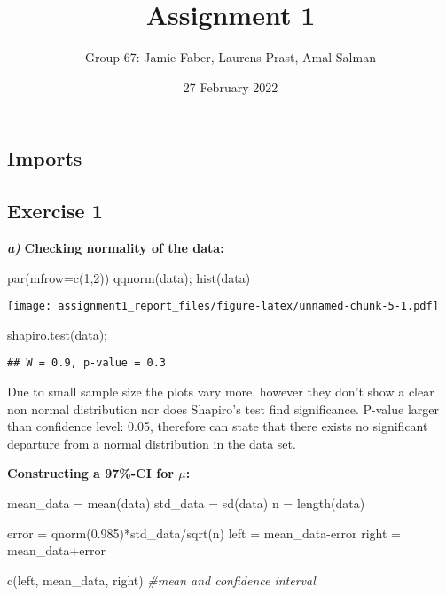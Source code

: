 \documentclass[
]{article}
\title{Assignment 1}
\author{Group 67: Jamie Faber, Laurens Prast, Amal Salman}
\date{27 February 2022}
\newenvironment{Shaded}{\begin{snugshade}}{\end{snugshade}}
\newcommand{\AttributeTok}[1]{\textcolor[rgb]{0.77,0.63,0.00}{#1}}
\newcommand{\CommentTok}[1]{\textcolor[rgb]{0.56,0.35,0.01}{\textit{#1}}}
\newcommand{\DecValTok}[1]{\textcolor[rgb]{0.00,0.00,0.81}{#1}}
\newcommand{\FloatTok}[1]{\textcolor[rgb]{0.00,0.00,0.81}{#1}}
\newcommand{\FunctionTok}[1]{\textcolor[rgb]{0.00,0.00,0.00}{#1}}
\newcommand{\NormalTok}[1]{#1}
\newcommand{\OtherTok}[1]{\textcolor[rgb]{0.56,0.35,0.01}{#1}}
\newcommand{\SpecialCharTok}[1]{\textcolor[rgb]{0.00,0.00,0.00}{#1}}
\begin{document}
\maketitle

\hypertarget{imports}{%
\subsection{Imports}\label{imports}}

\hypertarget{exercise-1}{%
\subsection{Exercise 1}\label{exercise-1}}

\textbf{\emph{a)}} \textbf{Checking normality of the data:}

\begin{Shaded}
\begin{Highlighting}[]
\FunctionTok{par}\NormalTok{(}\AttributeTok{mfrow=}\FunctionTok{c}\NormalTok{(}\DecValTok{1}\NormalTok{,}\DecValTok{2}\NormalTok{))}
\FunctionTok{qqnorm}\NormalTok{(data); }\FunctionTok{hist}\NormalTok{(data)}
\end{Highlighting}
\end{Shaded}

\texttt{[image: assignment1\_report\_files/figure-latex/unnamed-chunk-5-1.pdf]}

\begin{Shaded}
\begin{Highlighting}[]
\FunctionTok{shapiro.test}\NormalTok{(data);}
\end{Highlighting}
\end{Shaded}

\begin{verbatim}
## W = 0.9, p-value = 0.3
\end{verbatim}

Due to small sample size the plots vary more, however they don't show a
clear non normal distribution nor does Shapiro's test find significance.
P-value larger than confidence level: 0.05, therefore can state that
there exists no significant departure from a normal distribution in the
data set.

\textbf{Constructing a 97\%-CI for \(\mu\):}

\begin{Shaded}
\begin{Highlighting}[]
\NormalTok{mean\_data }\OtherTok{=} \FunctionTok{mean}\NormalTok{(data)}
\NormalTok{std\_data }\OtherTok{=} \FunctionTok{sd}\NormalTok{(data)}
\NormalTok{n }\OtherTok{=} \FunctionTok{length}\NormalTok{(data)}

\NormalTok{error }\OtherTok{=} \FunctionTok{qnorm}\NormalTok{(}\FloatTok{0.985}\NormalTok{)}\SpecialCharTok{*}\NormalTok{std\_data}\SpecialCharTok{/}\FunctionTok{sqrt}\NormalTok{(n)}
\NormalTok{left }\OtherTok{=}\NormalTok{ mean\_data}\SpecialCharTok{{-}}\NormalTok{error}
\NormalTok{right }\OtherTok{=}\NormalTok{ mean\_data}\SpecialCharTok{+}\NormalTok{error}

\FunctionTok{c}\NormalTok{(left, mean\_data, right)     }\CommentTok{\#mean and confidence interval}
\end{Highlighting}
\end{Shaded}
\end{document}
